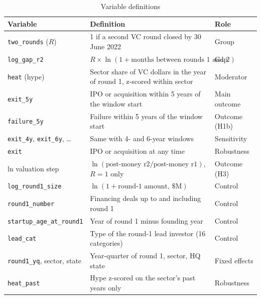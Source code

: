 \begin{table}[tbp]
\centering\footnotesize
\caption{Variable definitions}
\label{tab:T4}
\begin{tabular}{p{3.4cm}p{7.6cm}p{2.6cm}}
\toprule
Variable & Definition & Role \\
\midrule
\texttt{two\_rounds} ($R$) & 1 if a second VC round closed by 30 June 2022 & Group \\
\texttt{log\_gap\_r2} & $R\times\ln(1+\text{months between rounds 1 and 2})$ & Gap \\
\texttt{heat} (hype) & Sector share of VC dollars in the year of round 1, z-scored within sector & Moderator \\
\texttt{exit\_5y} & IPO or acquisition within 5 years of the window start & Main outcome \\
\texttt{failure\_5y} & Failure within 5 years of the window start & Outcome (H1b) \\
\texttt{exit\_4y}, \texttt{exit\_6y}, \dots & Same with 4- and 6-year windows & Sensitivity \\
\texttt{exit} & IPO or acquisition at any time & Robustness \\
ln valuation step & $\ln(\text{post-money r2}/\text{post-money r1})$, $R=1$ only & Outcome (H3) \\
\texttt{log\_round1\_size} & $\ln(1+\text{round-1 amount, \$M})$ & Control \\
\texttt{round1\_number} & Financing deals up to and including round 1 & Control \\
\texttt{startup\_age\_at\_round1} & Year of round 1 minus founding year & Control \\
\texttt{lead\_cat} & Type of the round-1 lead investor (16 categories) & Control \\
\texttt{round1\_yq}, sector, state & Year-quarter of round 1, sector, HQ state & Fixed effects \\
\texttt{heat\_past} & Hype z-scored on the sector's past years only & Robustness \\
\bottomrule
\end{tabular}
\end{table}
